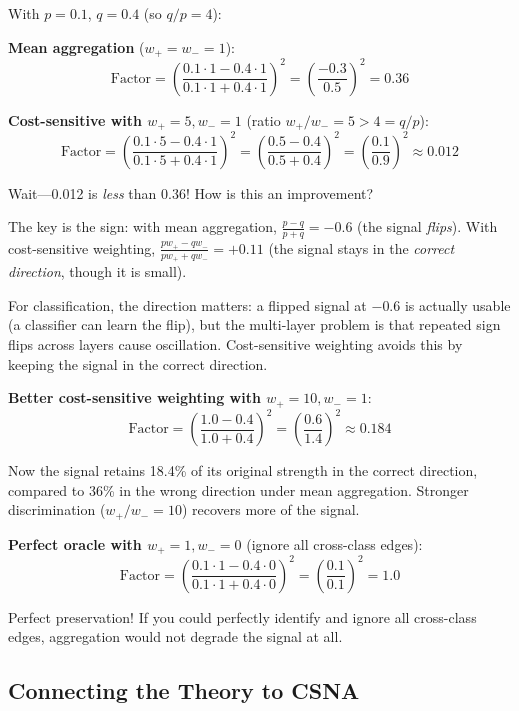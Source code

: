 \documentclass[11pt,a4paper]{article}
\theoremstyle{definition}
\theoremstyle{plain}
\begin{document}
\begin{example}
With $p = 0.1$, $q = 0.4$ (so $q/p = 4$):

\textbf{Mean aggregation} ($w_+ = w_- = 1$):
\[
  \text{Factor} = \left(\frac{0.1 \cdot 1 - 0.4 \cdot 1}{0.1 \cdot 1 + 0.4 \cdot 1}\right)^2
  = \left(\frac{-0.3}{0.5}\right)^2 = 0.36
\]

\textbf{Cost-sensitive with $w_+ = 5, w_- = 1$} (ratio $w_+/w_- = 5 > 4 = q/p$):
\[
  \text{Factor} = \left(\frac{0.1 \cdot 5 - 0.4 \cdot 1}{0.1 \cdot 5 + 0.4 \cdot 1}\right)^2
  = \left(\frac{0.5 - 0.4}{0.5 + 0.4}\right)^2
  = \left(\frac{0.1}{0.9}\right)^2 \approx 0.012
\]

Wait---0.012 is \emph{less} than 0.36! How is this an improvement?

The key is the sign: with mean aggregation, $\frac{p-q}{p+q} = -0.6$
(the signal \emph{flips}). With cost-sensitive weighting,
$\frac{pw_+ - qw_-}{pw_+ + qw_-} = +0.11$ (the signal stays in the
\emph{correct direction}, though it is small).

For classification, the direction matters: a flipped signal at $-0.6$ is
actually usable (a classifier can learn the flip), but the multi-layer problem
is that repeated sign flips across layers cause oscillation.
Cost-sensitive weighting avoids this by keeping the signal in the correct direction.

\textbf{Better cost-sensitive weighting with $w_+ = 10, w_- = 1$}:
\[
  \text{Factor} = \left(\frac{1.0 - 0.4}{1.0 + 0.4}\right)^2
  = \left(\frac{0.6}{1.4}\right)^2 \approx 0.184
\]

Now the signal retains 18.4\% of its original strength in the correct direction,
compared to 36\% in the wrong direction under mean aggregation.
Stronger discrimination ($w_+/w_- = 10$) recovers more of the signal.

\textbf{Perfect oracle with $w_+ = 1, w_- = 0$} (ignore all cross-class edges):
\[
  \text{Factor} = \left(\frac{0.1 \cdot 1 - 0.4 \cdot 0}{0.1 \cdot 1 + 0.4 \cdot 0}\right)^2
  = \left(\frac{0.1}{0.1}\right)^2 = 1.0
\]

Perfect preservation! If you could perfectly identify and ignore all cross-class
edges, aggregation would not degrade the signal at all.
\end{example}


\subsection{Connecting the Theory to CSNA}
\label{sec:theory_connection}
\end{document}
